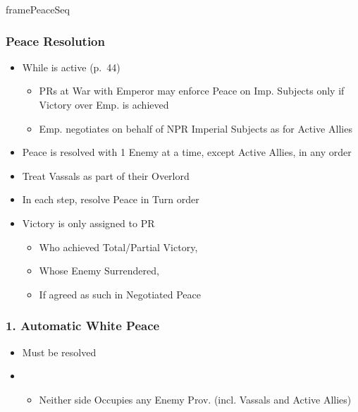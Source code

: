 \documentclass[10pt]{article}
\newlength{\fhPeaceSeq} \setlength\fhPeaceSeq{23.5\baselineskip}
\begin{document}
\begin{dynamiccontents*}{framePeaceSeq}\begin{eubox}{\fhPeaceSeq}
	\begin{multicols}{3}
		\subsubsection*{Peace Resolution }
		\begin{itemize}
			\item While  is active (p.~44)
			\begin{itemize}
				\item PRs at War with Emperor may enforce Peace on Imp. Subjects only if Victory over Emp. is achieved
				\item Emp. negotiates on behalf of NPR Imperial Subjects as for Active Allies
			\end{itemize}
			\item Peace is resolved with 1 Enemy at a time, except Active Allies, in any order
			\item Treat Vassals as part of their Overlord
			\item In each step, resolve Peace in Turn order
			\item Victory is only assigned to PR
			\begin{itemize}
				\item Who achieved Total/Partial Victory, 
				\item Whose Enemy Surrendered, 
				\item If agreed as such in Negotiated Peace
			\end{itemize}
		\end{itemize}

		\subsubsection*{1. Automatic White Peace}
		\begin{itemize}
			\item Must be resolved
			\item {}
			\begin{itemize}
				\item Neither side Occupies any Enemy Prov. (incl. Vassals and Active Allies)
			\end{itemize}
		\end{itemize}


\end{multicols}
\end{eubox}
\end{dynamiccontents*}
\end{document}
